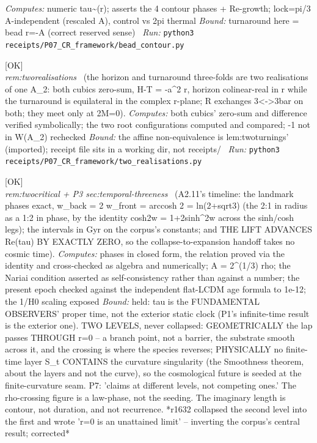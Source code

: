 \begin{description}
\emph{Computes:} numeric tau\textasciitilde{}(r); asserts the 4 contour phases + Re-growth; lock=pi/3 A-independent (rescaled A), control vs 2pi thermal
 \emph{Bound:} turnaround here = bead r=-A (correct reserved sense)
\ \emph{Run:} \texttt{python3 receipts/P07\_CR\_framework/bead\_contour.py}
\item[\rcptlabel{two_realisations}{P7R4}\textbf{P7R4}\quad\texttt{two\_realisations}]\hfill\textsf{[OK]}\\
\textit{rem:tworealisations} \ (the horizon and turnaround three-folds are two realisations of one A\_2: both cubics zero-sum, H-T = -a\textasciicircum{}2 r, horizon colinear-real in r while the turnaround is equilateral in the complex r-plane; R exchanges 3<->3bar on both; they meet only at 2M=0). 
\emph{Computes:} both cubics' zero-sum and difference verified symbolically; the two root configurations computed and compared; -1 not in W(A\_2) rechecked
 \emph{Bound:} the affine non-equivalence is lem:twoturnings' (imported); receipt file sits in a working dir, not receipts/
\ \emph{Run:} \texttt{python3 receipts/P07\_CR\_framework/two\_realisations.py}
\item[\rcptlabel{P07_lap_timeline}{P7R5}\textbf{P7R5}\quad\texttt{P07\_lap\_timeline}]\hfill\textsf{[OK]}\\
\textit{rem:twocritical + P3 sec:temporal-threeness} \ (A2.11's timeline: the landmark phases exact, w\_back = 2 w\_front = arccosh 2 = ln(2+sqrt3) (the 2:1 in radius as a 1:2 in phase, by the identity cosh2w = 1+2sinh\textasciicircum{}2w across the sinh/cosh legs); the intervals in Gyr on the corpus's constants; and THE LIFT ADVANCES Re(tau) BY EXACTLY ZERO, so the collapse-to-expansion handoff takes no cosmic time). 
\emph{Computes:} phases in closed form, the relation proved via the identity and cross-checked as algebra and numerically; A = 2\textasciicircum{}(1/3) rho; the Nariai condition asserted as self-consistency rather than against a number; the present epoch checked against the independent flat-LCDM age formula to 1e-12; the 1/H0 scaling exposed
 \emph{Bound:} held: tau is the FUNDAMENTAL OBSERVERS' proper time, not the exterior static clock (P1's infinite-time result is the exterior one). TWO LEVELS, never collapsed: GEOMETRICALLY the lap passes THROUGH r=0 -- a branch point, not a barrier, the substrate smooth across it, and the crossing is where the species reverses; PHYSICALLY no finite-time layer S\_t CONTAINS the curvature singularity (the Smoothness theorem, about the layers and not the curve), so the cosmological future is seeded at the finite-curvature seam. P7: 'claims at different levels, not competing ones.' The rho-crossing figure is a law-phase, not the seeding. The imaginary length is contour, not duration, and not recurrence. *r1632 collapsed the second level into the first and wrote 'r=0 is an unattained limit' -- inverting the corpus's central result; corrected*

\end{description}
